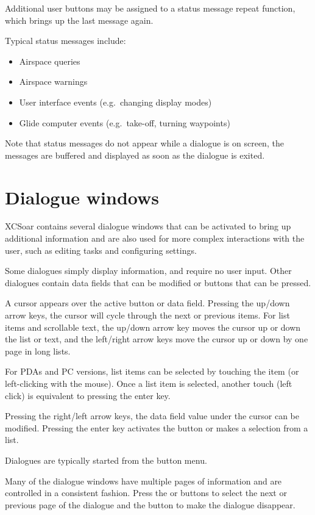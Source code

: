 Additional user buttons may be assigned to a status message repeat function,
which brings up the last message again.

Typical status messages include:
\begin{itemize}
\item Airspace queries
\item Airspace warnings
\item User interface events (e.g.\ changing display modes)
\item Glide computer events (e.g.\ take-off, turning waypoints)
\end{itemize}

Note that status messages do not appear while a dialogue is on screen, the
messages are buffered and displayed as soon as the dialogue is exited.


\section{Dialogue windows}\label{sec:dialog-windows}

XCSoar contains several dialogue windows that can be activated to bring up
additional information and are also used for more complex interactions with the
user, such as editing tasks and configuring settings.

Some dialogues simply display information, and require no user input. Other
dialogues contain data fields that can be modified or buttons that can be pressed.  

A cursor appears over the active button or data field. Pressing the up/down
arrow keys, the cursor will cycle
through the next or previous items. For list items and scrollable text, the
up/down arrow key moves the cursor up or down the list or text, and the
left/right arrow keys move the cursor up or down by one page in long lists.

For PDAs and PC versions, list items can be selected by touching the item (or
left-clicking with the mouse). Once a list item is selected, another touch
(left click) is equivalent to pressing the enter key.

Pressing the right/left arrow keys, the data field value under the
cursor can be modified. Pressing the enter key activates the button or
makes a selection from a list.

Dialogues are typically started from the button menu.  

Many of the dialogue windows have multiple pages of information and are controlled
in a consistent fashion. Press the \bmenuw{$<$} or \bmenuw{$>$} buttons to
select the next or previous page of the dialogue and the  button 
to make the dialogue disappear.

